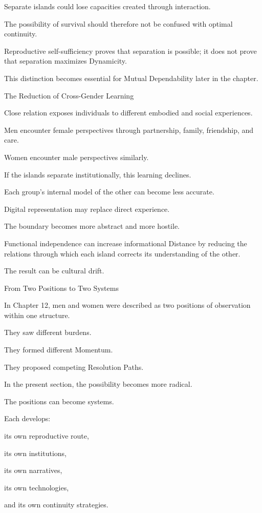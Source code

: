 Separate islands could lose capacities created through interaction.

The possibility of survival should therefore not be confused with optimal continuity.

Reproductive self-sufficiency proves that separation is possible; it does not prove that separation maximizes Dynamicity.

This distinction becomes essential for Mutual Dependability later in the chapter.

The Reduction of Cross-Gender Learning

Close relation exposes individuals to different embodied and social experiences.

Men encounter female perspectives through partnership, family, friendship, and care.

Women encounter male perspectives similarly.

If the islands separate institutionally, this learning declines.

Each group’s internal model of the other can become less accurate.

Digital representation may replace direct experience.

The boundary becomes more abstract and more hostile.

Functional independence can increase informational Distance by reducing the relations through which each island corrects its understanding of the other.

The result can be cultural drift.

From Two Positions to Two Systems

In Chapter 12, men and women were described as two positions of observation within one structure.

They saw different burdens.

They formed different Momentum.

They proposed competing Resolution Paths.

In the present section, the possibility becomes more radical.

The positions can become systems.

Each develops:

its own reproductive route,

its own institutions,

its own narratives,

its own technologies,

and its own continuity strategies.

